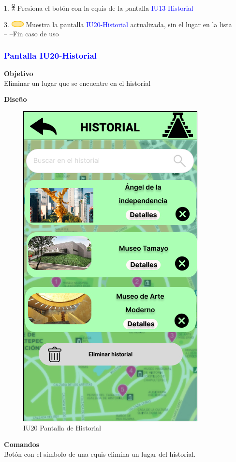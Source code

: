     1. \includegraphics[width=0.0150\textwidth]{Figuras/persona.png} Presiona el botón con la equis de la pantalla \textcolor{blue}{IU13-Historial}

    3. \includegraphics[width=0.0500\textwidth]{Figuras/sistema.png} Muestra la pantalla \textcolor{blue}{IU20-Historial} actualizada, sin el lugar en la lista\\
    -- --Fin caso de uso\\
    
\subsubsection{\textcolor{blue}{Pantalla IU20-Historial}}

\textbf{Objetivo} \\
Eliminar un lugar que se encuentre en el historial

\textbf{Diseño}

    \begin{figure}[h]
        
            \centering
            \includegraphics[width=.4\linewidth]{Pantallas Prototipo3/IU20 Pantalla Historial.jpg}
            \caption{IU20 Pantalla de Historial}
    
    \end{figure}
\textbf{Comandos} \\
Botón con el simbolo de una equis elimina un lugar del historial.

